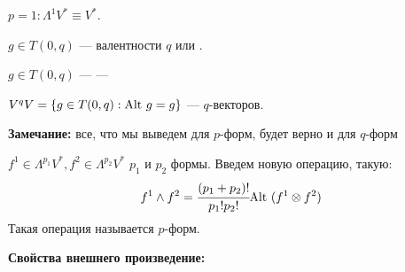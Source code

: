 $p = 1: \Lambda^1 V^* \equiv V^*$.

 $g\in T(0,q)$ ---  валентности $q$ или .

$g \in T(0,q)$ ---  --- 

$V^qV = \{g\in T(0,q): \text{Alt } g =g\}$ ---  $q$-векторов.

\textbf{Замечание:} все, что мы выведем для $p$-форм, будет верно и для $q$-форм

 $f^1 \in \Lambda^{p_1}V^*,f^2\in \Lambda^{p_2}V^*$ $p_1$ и $p_2$ формы. Введем новую операцию, такую:
$$f^1 \wedge f^2 = \cfrac{(p_1+p_2)!}{p_1!p_2!}\text{Alt } (f^1\otimes f^2)$$
Такая операция называется  $p$-форм.

\textbf{Свойства внешнего произведение:}

